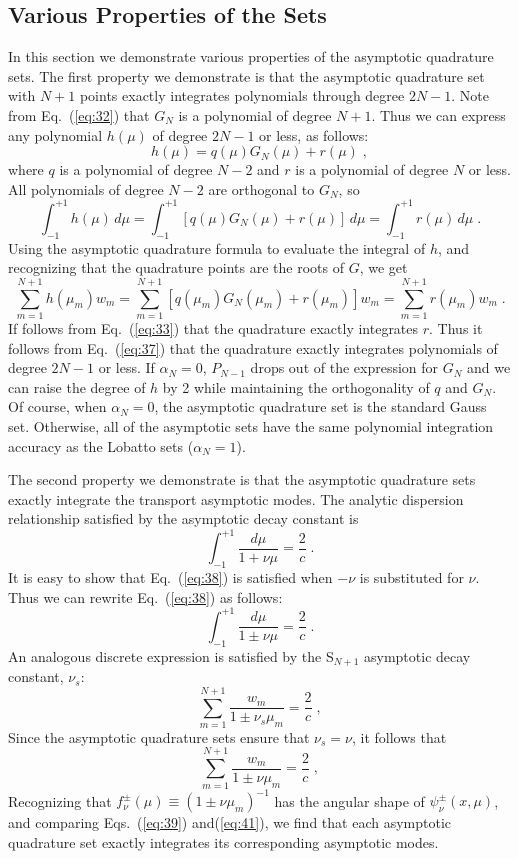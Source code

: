 \documentclass[12pt]{article}
\newcommand{\bracket}[1]{\left[ #1 \right]}
\newcommand{\be}{\begin{equation}}
\newcommand{\ee}{\end{equation}}
\newcommand{\pec}{\; ,}
\newcommand{\pep}{\; .}
\newcommand{\LEQ}[1]{\label{eq:#1}}
\newcommand{\EQ}[1]{Eq.~(\ref{eq:#1})}
\newcommand{\REQ}[1]{\ref{eq:#1}}
\newcommand{\bc}{\begin{center}}
\newcommand{\ec}{\end{center}}
\begin{document}
\subsection{Various Properties of the Sets}

In this section we demonstrate various properties of the asymptotic quadrature sets.  The first property we demonstrate is that the asymptotic quadrature set with $N+1$ points exactly integrates polynomials through degree $2N-1$. 
Note from \EQ{32} that $G_{N}$ is a polynomial of degree $N+1$.  Thus we can express any polynomial $h(\mu)$ of degree $2N-1$ or less, as follows:
\be
h(\mu)=q(\mu)G_{N}(\mu) + r(\mu)   \pec
\LEQ{35}
\ee
where $q$ is a polynomial of degree $N-2$ and $r$ is a polynomial of degree $N$ or less. All polynomials of degree $N-2$ are orthogonal to $G_N$, so 
\be
\int_{-1}^{+1} h(\mu) \, d\mu = \int_{-1}^{+1} \bracket{q(\mu)G_{N}(\mu) + r(\mu)} \, d\mu = \int_{-1}^{+1} r(\mu) \, d\mu \pep
\LEQ{36}
\ee
Using the asymptotic quadrature formula to evaluate the integral of $h$, and recognizing that the quadrature points are the roots of $G$, we get
\be
\sum_{m=1}^{N+1} h(\mu_m) w_m = \sum_{m=1}^{N+1} \bracket{q(\mu_m)G_{N}(\mu_m) + r(\mu_m)} w_m = \sum_{m=1}^{N+1} r(\mu_m) w_m \pep
\LEQ{37}
\ee
If follows from \EQ{33} that the quadrature exactly integrates $r$.  Thus it follows from \EQ{37} that the quadrature exactly integrates polynomials 
of degree $2N-1$ or less.  If $\alpha_N=0$, $P_{N-1}$ drops out of the expression for $G_N$ and we can raise the degree of $h$ by 2 while maintaining 
the orthogonality of $q$ and $G_N$.  Of course, when $\alpha_N=0$, the asymptotic quadrature set is the standard Gauss set.  Otherwise, all of the 
asymptotic sets have the same polynomial integration accuracy as the Lobatto sets ($\alpha_N=1$).

The second property we demonstrate is that the asymptotic quadrature sets exactly integrate the transport asymptotic modes. 
The analytic dispersion relationship satisfied by the asymptotic decay constant is 
\be
\int_{-1}^{+1} \frac{d\mu}{1 + \nu \mu }  = \frac{2}{c} \pep
\LEQ{38}
\ee
It is easy to show that \EQ{38} is satisfied when $-\nu$ is substituted for $\nu$. Thus we can rewrite \EQ{38} as follows:
\be
\int_{-1}^{+1} \frac{d\mu}{1 \pm \nu \mu }  = \frac{2}{c} \pep
\LEQ{39}
\ee
An analogous discrete expression is satisfied by the S$_{N+1}$ asymptotic decay constant, $\nu_s$: 
\be
\sum_{m=1}^{N+1} \frac{w_m}{1 \pm \nu_{s} \mu_m } = \frac{2}{c} \pec
\LEQ{40}
\ee
Since the asymptotic quadrature sets ensure that $\nu_{s}=\nu$, it follows that 
\be
\sum_{m=1}^{N+1} \frac{w_m}{1 \pm \nu \mu_m } = \frac{2}{c} \pec
\LEQ{41}
\ee
Recognizing that $f^{\pm}_{\nu}(\mu) \equiv (1 \pm \nu \mu_m)^{-1}$ has the angular shape of $\psi^{\pm}_{\nu}(x,\mu)$, 
and comparing Eqs.~(\REQ{39}) and(\REQ {41}), we find that each asymptotic quadrature set exactly integrates its corresponding 
asymptotic modes. 
\end{document}
